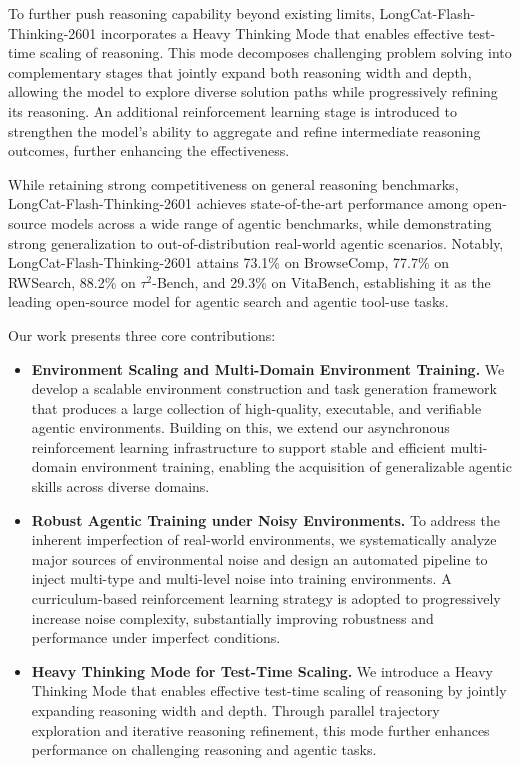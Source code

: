 \documentclass{article}
\newcommand{\longcat}{LongCat-Flash-Thinking-2601\xspace}
\begin{document}
To further push reasoning capability beyond existing limits, \longcat incorporates a Heavy Thinking Mode that enables effective test-time scaling of reasoning.
This mode decomposes challenging problem solving into complementary stages that jointly expand both reasoning width and depth, allowing the model to explore diverse solution paths while progressively refining its reasoning.
An additional reinforcement learning stage is introduced to strengthen the model’s ability to aggregate and refine intermediate reasoning outcomes, further enhancing the effectiveness.

While retaining strong competitiveness on general reasoning benchmarks, \longcat achieves state-of-the-art performance among open-source models across a wide range of agentic benchmarks, while demonstrating strong generalization to out-of-distribution real-world agentic scenarios.
Notably, \longcat attains 73.1\% on BrowseComp, 77.7\% on RWSearch, 88.2\% on $\tau^2$-Bench, and 29.3\% on VitaBench, establishing it as the leading open-source model for agentic search and agentic tool-use tasks.

Our work presents three core contributions:
\begin{itemize}
    \item \textbf{Environment Scaling and Multi-Domain Environment Training.}
    We develop a scalable environment construction and task generation framework that produces a large collection of high-quality, executable, and verifiable agentic environments.
    Building on this, we extend our asynchronous reinforcement learning infrastructure to support stable and efficient multi-domain environment training, enabling the acquisition of generalizable agentic skills across diverse domains.

    \item \textbf{Robust Agentic Training under Noisy Environments.}
    To address the inherent imperfection of real-world environments, we systematically analyze major sources of environmental noise and design an automated pipeline to inject multi-type and multi-level noise into training environments.
    A curriculum-based reinforcement learning strategy is adopted to progressively increase noise complexity, substantially improving robustness and performance under imperfect conditions.

    \item \textbf{Heavy Thinking Mode for Test-Time Scaling.}
    We introduce a Heavy Thinking Mode that enables effective test-time scaling of reasoning by jointly expanding reasoning width and depth.
    Through parallel trajectory exploration and iterative reasoning refinement, this mode further enhances performance on challenging reasoning and agentic tasks.
\end{itemize}
\end{document}
